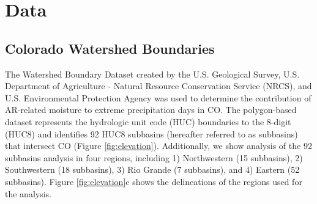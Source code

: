 \documentclass[draft]{agujournal2019}
\begin{document}






\section{Data}
\label{sec:data}
\subsection{Colorado Watershed Boundaries}
The Watershed Boundary Dataset created by the U.S. Geological Survey, U.S. Department of Agriculture - Natural Resource Conservation Service (NRCS), and U.S. Environmental Protection Agency was used to determine the contribution of AR-related moisture to extreme precipitation days in CO. The polygon-based dataset represents the hydrologic unit code (HUC) boundaries to the 8-digit (HUC8) and identifies 92 HUC8 subbasins (hereafter referred to as subbasins) that intersect CO (Figure \ref{fig:elevation}). Additionally, we show analysis of the 92 subbasins analysis in four regions, including 1) Northwestern (15 subbasins), 2) Southwestern (18 subbasins), 3) Rio Grande (7 subbasins), and 4) Eastern (52 subbasins). Figure \ref{fig:elevation}c shows the delineations of the regions used for the analysis.
\end{document}
